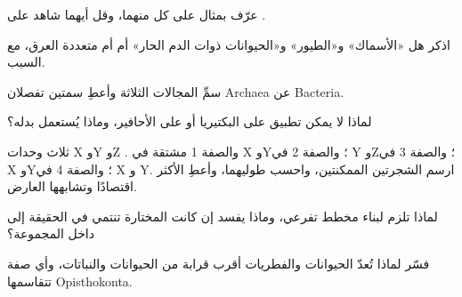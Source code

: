 \begin{exercise}[$\star$]\label{exo:b1:classifying-biodiversity:2}
عرّف   بمثال على كل منهما، وقل أيهما
شاهد على .
\end{exercise}

\begin{exercise}[$\star$]\label{exo:b1:classifying-biodiversity:3}
اذكر هل «الأسماك» و«الطيور» و«الحيوانات ذوات الدم الحار»
 أم  أم متعددة العرق، مع السبب.
\end{exercise}

\begin{exercise}[$\star$]\label{exo:b1:classifying-biodiversity:4}
سمِّ المجالات الثلاثة وأعطِ سمتين تفصلان
Archaea عن Bacteria.
\end{exercise}

\begin{exercise}[$\star\star$]\label{exo:b1:classifying-biodiversity:5}
لماذا لا يمكن تطبيق  على البكتيريا أو
على الأحافير، وماذا يُستعمل بدله؟
\end{exercise}

\begin{exercise}[$\star\star$]\label{exo:b1:classifying-biodiversity:6}
ثلاث وحدات X وY وZ . والصفة 1 مشتقة في X وY؛
والصفة 2 في Y وZ؛ والصفة 3 في X وY؛ والصفة 4 في X و
Y. ارسم الشجرتين الممكنتين، واحسب طوليهما، وأعطِ
الأكثر اقتصادًا وتشابهها العارض.
\end{exercise}

\begin{exercise}[$\star\star$]\label{exo:b1:classifying-biodiversity:7}
لماذا تلزم  لبناء مخطط تفرعي، وماذا يفسد
إن كانت  المختارة تنتمي في الحقيقة إلى داخل المجموعة؟
\end{exercise}

\begin{exercise}[$\star\star$]\label{exo:b1:classifying-biodiversity:8}
فسّر لماذا تُعدّ الحيوانات والفطريات أقرب قرابة من
الحيوانات والنباتات، وأي صفة تتقاسمها Opisthokonta.
\end{exercise}

